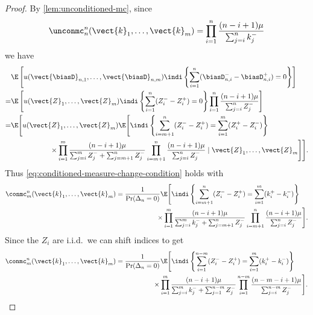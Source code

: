 \begin{proof}
    By \cref{lem:unconditioned-mc}, since
    \begin{equation*}
        \unconmc^n_n(\vect{k}_1, \ldots, \vect{k}_m) =
        \prod_{i=1}^n \frac{(n - i + 1) \mu}{\sum_{j=i}^n k_j^-}
    \end{equation*}
    we have
    \begin{align*}
        &\E\left[u(\vect{\biasD}_{n, 1}, \ldots, \vect{\biasD}_{n, m}) \indi\left\{ \sum_{i=1}^n (\biasD^-_{n, i} - \biasD^+_{n, i}) = 0 \right\} \right] \\
        = &\E\left[u(\vect{Z}_1, \ldots, \vect{Z}_m) \indi\left\{ \sum_{i=1}^n (Z_i^- - Z_i^+) = 0 \right\} \prod_{i=1}^n \frac{(n - i + 1) \mu}{\sum_{j=i}^n Z_j^-} \right] \\
        = &\E\Bigg[u(\vect{Z}_1, \ldots, \vect{Z}_m) \E \Bigg[ \indi\left\{ \sum_{i=m+1}^n (Z_i^- - Z_i^+) = \sum_{i=1}^m (Z^+_i - Z^-_i) \right\} \nonumber \\
       & \hspace{5.5em} \times \prod_{i=1}^m \frac{(n - i + 1)\mu}{\sum_{j=i}^m Z_j^- + \sum_{j = m+1}^n Z_j^-} \prod_{i=m+1}^n \frac{(n - i + 1) \mu}{\sum_{j=i}^n Z_j^-} \mid \vect{Z}_1, \ldots, \vect{Z}_m \Bigg] \Bigg].
    \end{align*}
    Thus \cref{eq:conditioned-measure-change-condition} holds with
    \begin{align*}
        \conmc^n_m(\vect{k}_1, \ldots, \vect{k}_m)
        &= \frac{1}{\Pr(\Delta_n = 0)}\E\Bigg[ \indi\left\{ \sum_{i=m+1}^n (Z_i^- - Z_i^+) = \sum_{i=1}^m (k^+_i - k^-_i)\right\} \nonumber \\
        &\hspace{6em} \times \prod_{i=1}^m \frac{(n - i + 1)\mu}{\sum_{j=i}^m k_j^- + \sum_{j = m+1}^n Z_j^-} \prod_{i=m+1}^n \frac{(n - i + 1) \mu}{\sum_{j=i}^n Z_j^-} \Bigg].
    \end{align*}
    Since the $Z_i$ are i.i.d.\ we can shift indices to get
    \begin{align*}
        \conmc^n_m(\vect{k}_1, \ldots, \vect{k}_m)
        &= \frac{1}{\Pr(\Delta_n = 0)}\E\Bigg[ \indi\left\{ \sum_{i=1}^{n-m} (Z_i^- - Z_i^+) = \sum_{i=1}^m (k^+_i - k^-_i)\right\} \nonumber \\
        &\hspace{5.5em} \times \prod_{i=1}^m \frac{(n - i + 1)\mu}{\sum_{j=i}^m k_j^- + \sum_{j = 1}^{n -m} Z_j^-} \prod_{i=1}^{n-m} \frac{(n - m - i + 1) \mu}{\sum_{j=i}^{n - m} Z_j^-} \Bigg].
    \end{align*}

\end{proof}
